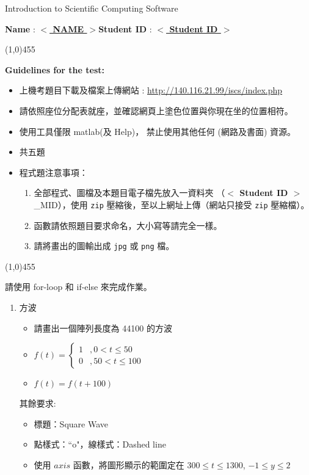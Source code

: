 \documentclass[12pt,a4paper]{article}
\newcommand{\placeholder}[1]{\textbf{$<$ #1 $>$}}
\newcommand{\idnumber}{\placeholder{Student ID}}
\newcommand{\name}{\placeholder{NAME}}
\begin{document}
\begin{center}{\large Introduction to Scientific Computing Software}\end{center}

\begin{center}\textbf{Name} : \underline{ \name{}}\qquad\qquad\qquad\textbf{Student ID} : \underline{ \idnumber{}}\end{center}

\begin{center}
\line(1,0){455}
\end{center}
\textbf{Guidelines for the test:}
\begin{itemize}
\item 上機考題目下載及檔案上傳網站 : \url{http://140.116.21.99/iscs/index.php}
\item 請依照座位分配表就座，並確認網頁上塗色位置與你現在坐的位置相符。
\item 使用工具僅限 matlab(及 Help)， 禁止使用其他任何 (網路及書面) 資源。
\item 共五題
\item 程式題注意事項：
\begin{enumerate}
\item 全部程式、圖檔及本題目電子檔先放入一資料夾 （\idnumber{}\_MID），使用 \texttt{zip} 壓縮後，至以上網址上傳（網站只接受 \texttt{zip} 壓縮檔）。
\item 函數請依照題目要求命名，大小寫等請完全一樣。
\item 請將畫出的圖輸出成 \texttt{jpg} 或 \texttt{png} 檔。
\end{enumerate}
\end{itemize}
\begin{center}
\line(1,0){455}
\end{center}
請使用 for-loop 和 if-else 來完成作業。
\begin{enumerate}
\item 方波
\begin{itemize} 
\item 請畫出一個陣列長度為 44100 的方波

\item $f(t)=\left\{\begin{array}{lc}1&,0 < t\le50 \\ 0 &,50 < t \le 100\end{array}\right.$
\item $f(t)=f(t+100)$
\end{itemize}
其餘要求:
\begin{itemize}
\item 標題：Square Wave
\item 點樣式：``o"，線樣式：Dashed line
\item 使用 $axis$ 函數，將圖形顯示的範圍定在 $300 \le t \le 1300$, $-1\le y \le 2$
\end{itemize}
\end{enumerate}
\end{document}
